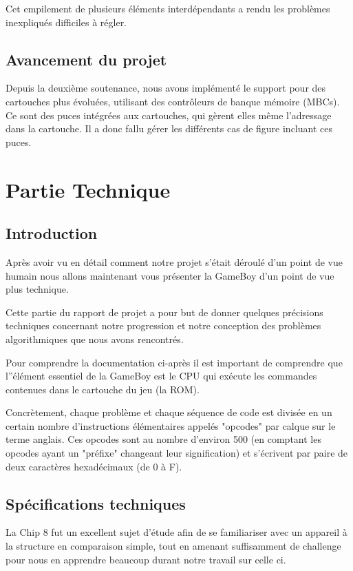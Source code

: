 \documentclass[12pt, a4paper]{article}
\begin{document}
\bigskip
Cet empilement de plusieurs éléments interdépendants a rendu les problèmes inexpliqués difficiles à régler.

\subsection{Avancement du projet}

Depuis la deuxième soutenance, nous avons implémenté le support pour des cartouches plus évoluées, utilisant des contrôleurs de banque mémoire (MBCs). Ce sont des puces intégrées aux cartouches, qui gèrent elles même l'adressage dans la cartouche. Il a donc fallu gérer les différents cas de figure incluant ces puces.


\pagebreak
\section{Partie Technique}
\subsection{Introduction}

Après avoir vu en détail comment notre projet s'était déroulé d'un point de vue humain nous allons maintenant vous présenter la GameBoy d'un point de vue plus technique.

Cette partie du rapport de projet a pour but de donner quelques précisions techniques concernant notre progression et notre conception des problèmes algorithmiques que nous avons rencontrés.

Pour comprendre la documentation ci-après il est important de comprendre que l''élément essentiel de la GameBoy est le CPU qui exécute les commandes contenues dans le cartouche du jeu (la ROM). 

Concrètement, chaque problème et chaque séquence de code est divisée en un certain nombre d'instructions élémentaires appelés "opcodes" par calque sur le terme anglais. Ces opcodes sont au nombre d'environ 500 (en comptant les opcodes ayant un "préfixe" changeant leur signification) et s'écrivent par paire de deux caractères hexadécimaux (de 0 à F).
\pagebreak

\subsection{Spécifications techniques}

La Chip 8 fut un excellent sujet d'étude afin de se familiariser avec un appareil à la structure en comparaison simple, tout en amenant suffisamment de challenge pour nous en apprendre beaucoup durant notre travail sur celle ci.
\end{document}
